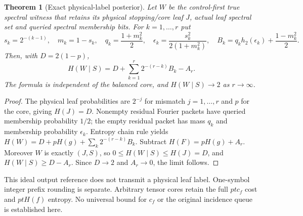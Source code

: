 \documentclass[11pt]{article}
\newtheorem{theorem}{Theorem}
\begin{document}
\begin{theorem}[Exact physical-label posterior]
Let $W$ be the control-first true spectral witness that retains its
physical stopping/core leaf $J$, actual leaf spectral set and queried
spectral membership bits. For $k=1,\ldots,r$ put
\[
s_k=2^{-(k-1)},\quad m_k=1-s_k,\quad q_k=\frac{1+m_k^2}{2},\quad
\epsilon_k=\frac{s_k^2}{2(1+m_k^2)},\quad
B_k=q_k h_2(\epsilon_k)+\frac{1-m_k^2}{2}.
\]
Then, with $D=2(1-p)$,
\[
H(W\mid S)=D+\sum_{k=1}^r2^{-(r-k)}B_k-A_r.
\]
The formula is independent of the balanced core, and
$H(W\mid S)\to2$ as $r\to\infty$.
\end{theorem}
\begin{proof}
The physical leaf probabilities are $2^{-j}$ for mismatch $j=1,\ldots,r$
and $p$ for the core, giving $H(J)=D$. Nonempty residual Fourier packets
have queried membership probability $1/2$; the empty residual packet
has mass $q_k$ and membership probability $\epsilon_k$.
Entropy chain rule yields
$H(W)=D+pH(g)+\sum_k2^{-(r-k)}B_k$.
Subtract $H(F)=pH(g)+A_r$. Moreover $W$ is exactly $(J,S)$, so
$0\le H(W\mid S)\le H(J)=D$, and
$H(W\mid S)\ge D-A_r$. Since $D\to2$ and $A_r\to0$, the limit follows.
\end{proof}
This ideal output reference does not transmit a physical leaf label.
One-symbol integer prefix rounding is separate. Arbitrary tensor cores
retain the full $ptc_f$ cost and $ptH(f)$ entropy. No universal bound for
$c_f$ or the original incidence queue is established here.
\end{document}
